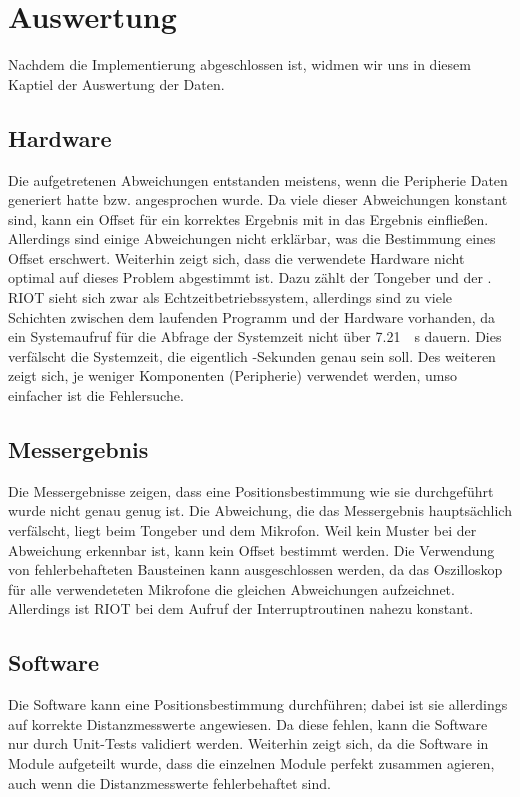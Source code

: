 \newpage
\section{Auswertung}

Nachdem die Implementierung abgeschlossen ist, widmen wir uns in diesem Kaptiel der Auswertung der Daten.

\subsection{Hardware}
Die aufgetretenen Abweichungen entstanden meistens, wenn die Peripherie Daten generiert hatte bzw. angesprochen wurde. Da viele dieser Abweichungen konstant sind, kann ein Offset für ein korrektes Ergebnis mit in das Ergebnis einfließen. Allerdings sind einige Abweichungen nicht erklärbar, was die Bestimmung eines Offset erschwert. Weiterhin zeigt sich, dass die verwendete Hardware nicht optimal auf dieses Problem abgestimmt ist. Dazu zählt der Tongeber und der \microphone . RIOT sieht sich zwar als Echtzeitbetriebssystem, allerdings sind zu viele Schichten zwischen dem laufenden Programm und der Hardware vorhanden, da ein Systemaufruf für die Abfrage der Systemzeit nicht über \SI{7,21}{\mu s} dauern. Dies verfälscht die Systemzeit, die eigentlich \si{\mu}-Sekunden genau sein soll. Des weiteren zeigt sich, je weniger Komponenten (Peripherie) verwendet werden, umso einfacher ist die Fehlersuche.

\subsection{Messergebnis}
Die Messergebnisse zeigen, dass eine Positionsbestimmung wie sie durchgeführt wurde nicht genau genug ist. Die Abweichung, die das Messergebnis hauptsächlich verfälscht, liegt beim Tongeber und dem Mikrofon. Weil kein Muster bei der Abweichung erkennbar ist, kann kein Offset bestimmt werden. Die Verwendung von fehlerbehafteten Bausteinen kann ausgeschlossen werden, da das Oszilloskop für alle verwendeteten Mikrofone die gleichen Abweichungen aufzeichnet. Allerdings ist RIOT bei dem Aufruf der Interruptroutinen nahezu konstant. 

\subsection{Software}
Die Software kann eine Positionsbestimmung durchführen; dabei ist sie allerdings auf korrekte Distanzmesswerte angewiesen. Da diese fehlen, kann die Software nur durch Unit-Tests validiert werden. Weiterhin zeigt sich, da die Software in Module aufgeteilt wurde, dass die einzelnen Module perfekt zusammen agieren, auch wenn die Distanzmesswerte fehlerbehaftet sind.


